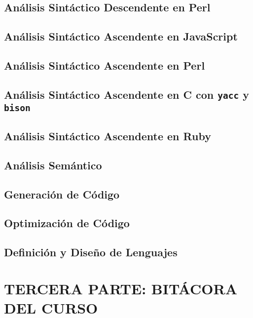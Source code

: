\documentclass[11pt,a4paper,oneside,onecolumn]{book}
\begin{document}
  

  

\chapter{Análisis Sintáctico Descendente en Perl}


\chapter{Análisis Sintáctico Ascendente en JavaScript}


\chapter{Análisis Sintáctico Ascendente en Perl}


\chapter{Análisis Sintáctico Ascendente en C con {\tt yacc} y {\tt bison}}


\chapter{Análisis Sintáctico Ascendente en Ruby}



\chapter{Análisis Semántico}

\chapter{Generación de Código}

\chapter{Optimización de Código}

\chapter{Definición y Diseño de Lenguajes}



\part{TERCERA PARTE: BITÁCORA DEL CURSO}


\tableofcontents 
\listoffigures
\listoftables

\printindex


%
%

\end{document}
